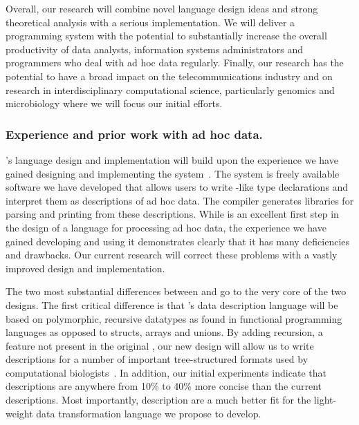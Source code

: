 \documentclass[11pt]{article}
\begin{document}
Overall, our research will combine novel language design ideas and
strong theoretical analysis with a serious implementation.  We will
deliver a programming system with the potential to substantially
increase the overall productivity of data analysts, 
information systems administrators
and programmers who
deal with ad hoc data regularly.  Finally, our research has the potential
to have  a
broad impact on the telecommunications industry and on
research in interdisciplinary computational science,
particularly genomics and microbiology where we will focus
our initial efforts.

\subsubsection{Experience and prior work with ad hoc data.}
\datatype's language design and implementation will build upon the experience
we have gained designing and implementing the \pads{}
system~\cite{fisher+:pads,pads-website}.  The \pads{} system 
is freely available software we have developed that allows
users to write \C-like type declarations and interpret them as
descriptions of ad hoc data.  The \pads{} compiler generates libraries
for parsing and printing from these descriptions.  
While \pads{} is an excellent first step in the design of
a language for processing ad hoc data, the experience we have
gained developing and using it demonstrates clearly that 
it has many deficiencies and drawbacks.  Our current research 
will correct these problems with a vastly improved
design and implementation.

The two most substantial differences between \pads{} and 
\datatype{} go to the very core of the two designs.
The first critical difference is that 
\datatype's data description language will be based on
polymorphic, recursive datatypes as found in functional programming languages
as opposed to \C{} structs, arrays
and unions.  By adding recursion, a feature not present in the original
\pads, our new design will allow us to write descriptions for a
number of important tree-structured formats used by computational 
biologists~\cite{go,newick}.  In addition, our initial
experiments indicate that \datatype{} descriptions are anywhere from
10\% to 40\% more concise than the current \pads{} descriptions.  Most
importantly, \datatype{} description are a much better fit for the
light-weight data transformation language we propose to develop.  
\end{document}
